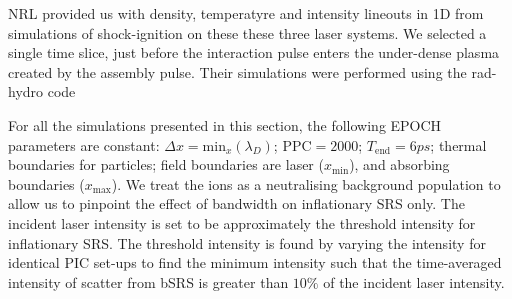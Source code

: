 NRL provided us with density, temperatyre and intensity lineouts in 1D from simulations of shock-ignition on these these three laser systems. We selected a single time slice, just before the interaction pulse enters the under-dense plasma created by the assembly pulse. Their simulations were performed using the rad-hydro code 

For all the simulations presented in this section, the following EPOCH parameters are constant: $\Delta x = \mathrm{min}_x(\lambda_D)$; $\mathrm{PPC} = 2000$; $T_{\mathrm{end}}=6\si{ps}$; thermal boundaries for particles; field boundaries are laser ($x_{\mathrm{min}}$), and absorbing boundaries ($x_{\mathrm{max}}$). We treat the ions as a neutralising background population to allow us to pinpoint the effect of bandwidth on inflationary SRS only. The incident laser intensity is set to be approximately the threshold intensity for inflationary SRS. The threshold intensity is found by varying the intensity for identical PIC set-ups to find the minimum intensity such that the time-averaged intensity of scatter from bSRS is greater than $10\%$ of the incident laser intensity. 

